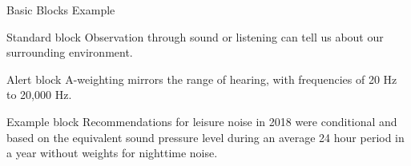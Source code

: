 \documentclass{beamer}
\begin{document}
\begin{frame}{Basic Blocks Example}

\begin{block}{Standard block}
  Observation through sound or listening can tell us about our surrounding environment.
\end{block}

\begin{alertblock}{Alert block}
  A-weighting mirrors the range of hearing, with frequencies of 20 Hz to 20,000 Hz.
\end{alertblock}

\begin{exampleblock}{Example block}
  Recommendations for leisure noise in 2018 were conditional and based on the equivalent sound pressure level during an average 24 hour period in a year without weights for nighttime noise.
\end{exampleblock}

\end{frame}
\end{document}
